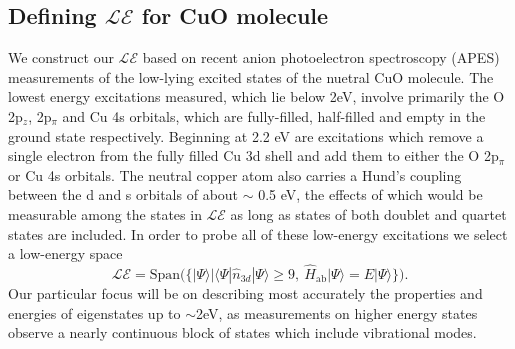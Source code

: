 \documentclass{article}
\begin{document}
\subsection{Defining $\mathcal{LE}$ for CuO molecule}
We construct our $\mathcal{LE}$ based on recent anion photoelectron spectroscopy (APES) measurements of the low-lying excited states of the nuetral CuO molecule. 
The lowest energy excitations measured, which lie below 2eV, involve primarily the O 2p$_z$, 2p$_\pi$ and Cu 4s orbitals, which are fully-filled, half-filled and empty in the ground state respectively.
Beginning at 2.2 eV are excitations which remove a single electron from the fully filled Cu 3d shell and add them to either the O 2p$_\pi$ or Cu 4s orbitals.
The neutral copper atom also carries a Hund's coupling between the d and s orbitals of about $\sim$ 0.5 eV, the effects of which would be measurable among the states in $\mathcal{LE}$ as long as states of both doublet and quartet states are included.
In order to probe all of these low-energy excitations we select a low-energy space
\begin{equation}
\mathcal{LE} = \text{Span(}\{ |\Psi \rangle | \langle \Psi | \hat{n}_{3d} | \Psi \rangle \ge 9,\ \hat{H}_\text{ab}|\Psi\rangle = E |\Psi\rangle \}\text{)}.
\label{eq:LE}
\end{equation}
Our particular focus will be on describing most accurately the properties and energies of eigenstates up to $\sim$2eV, as measurements on higher energy states observe a nearly continuous block of states which include vibrational modes.
\end{document}
